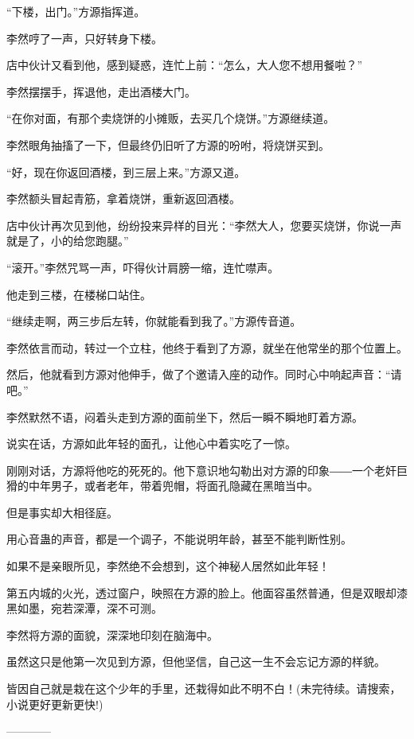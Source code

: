 \begin{this_body}
“下楼，出门。”方源指挥道。

李然哼了一声，只好转身下楼。

店中伙计又看到他，感到疑惑，连忙上前：“怎么，大人您不想用餐啦？”

李然摆摆手，挥退他，走出酒楼大门。

“在你对面，有那个卖烧饼的小摊贩，去买几个烧饼。”方源继续道。

李然眼角抽搐了一下，但最终仍旧听了方源的吩咐，将烧饼买到。

“好，现在你返回酒楼，到三层上来。”方源又道。

李然额头冒起青筋，拿着烧饼，重新返回酒楼。

店中伙计再次见到他，纷纷投来异样的目光：“李然大人，您要买烧饼，你说一声就是了，小的给您跑腿。”

“滚开。”李然咒骂一声，吓得伙计肩膀一缩，连忙噤声。

他走到三楼，在楼梯口站住。

“继续走啊，两三步后左转，你就能看到我了。”方源传音道。

李然依言而动，转过一个立柱，他终于看到了方源，就坐在他常坐的那个位置上。

然后，他就看到方源对他伸手，做了个邀请入座的动作。同时心中响起声音：“请吧。”

李然默然不语，闷着头走到方源的面前坐下，然后一瞬不瞬地盯着方源。

说实在话，方源如此年轻的面孔，让他心中着实吃了一惊。

刚刚对话，方源将他吃的死死的。他下意识地勾勒出对方源的印象――一个老奸巨猾的中年男子，或者老年，带着兜帽，将面孔隐藏在黑暗当中。

但是事实却大相径庭。

用心音蛊的声音，都是一个调子，不能说明年龄，甚至不能判断性别。

如果不是亲眼所见，李然绝不会想到，这个神秘人居然如此年轻！

第五内城的火光，透过窗户，映照在方源的脸上。他面容虽然普通，但是双眼却漆黑如墨，宛若深潭，深不可测。

李然将方源的面貌，深深地印刻在脑海中。

虽然这只是他第一次见到方源，但他坚信，自己这一生不会忘记方源的样貌。

皆因自己就是栽在这个少年的手里，还栽得如此不明不白！(未完待续。请搜索，小说更好更新更快!)

------------

\end{this_body}

